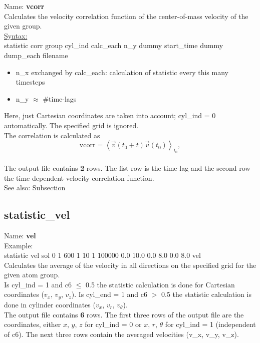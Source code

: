 Name: {\bfseries vcorr}
\\[2ex]
Calculates the velocity correlation function of the center-of-mass velocity of the given group.
\\[2ex]
\underline{Syntax:}\\
statistic	corr group cyl\_ind calc\_each n\_y dummy start\_time dummy dump\_each filename
\begin{itemize}
\item n\_x exchanged by calc\_each: calculation of statistic every this many timesteps
\item n\_y $\approx$ \#time-lags
\end{itemize} 
Here, just Cartesian coordinates are taken into account; cyl\_ind = 0 automatically.
The specified grid is ignored.\\
The correlation is calculated as
\begin{equation}
\mathrm{vcorr} = \left \langle \vec{v}(t_0 + t) \vec{v}(t_0)  \right \rangle _{t_0},
\label{eq:vcorr}
\end{equation}
\\[2ex]
The output file contains {\bfseries 2} rows.
The fist row is the time-lag and the second row the time-dependent velocity correlation function.
\\[2ex]
See also: Subsection 


\subsection{statistic\_vel}

Name: {\bfseries vel}
\\[2ex]
Example:
\\[0.5ex]
statistic       vel sol 0 1 600 1 10 1 100000 0.0 10.0 0.0 8.0 0.0 8.0 vel
\\[2ex]
Calculates the average of the velocity in all directions on the specified grid for the given atom group.
\\[2ex]
Is cyl\_ind = 1 and c6 $\le$ 0.5 the statistic calculation is done for Cartesian coordinates ($v_x$, $v_y$, $v_z$).
Is cyl\_end = 1 and c6 $>$ 0.5 the statistic calculation is done in cylinder coordinates ($v_x$, $v_r$, $v_{\theta}$).
\\[2ex]
The output file contains {\bfseries 6} rows.
The first three rows of the output file are the coordinates, either $x$, $y$, $z$ for cyl\_ind = 0 or $x$, $r$, $\theta$ for cyl\_ind = 1 (independent of c6).
The next three rows contain the averaged velocities (v\_x, v\_y, v\_z).


